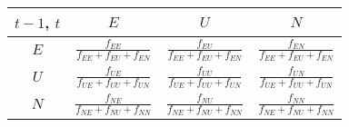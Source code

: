 \begin{tabular}{c|c|c|c}
  \hline \hline
  $t-1$, $t$ & $E$ & $U$ & $N$ \\ \hline
  $E$        & $\frac{f_{EE}}{f_{EE}+f_{EU}+f_{EN}}$
             & $\frac{f_{EU}}{f_{EE}+f_{EU}+f_{EN}}$
             & $\frac{f_{EN}}{f_{EE}+f_{EU}+f_{EN}}$
             \\ \hline
  $U$        & $\frac{f_{UE}}{f_{UE}+f_{UU}+f_{UN}}$
             & $\frac{f_{UU}}{f_{UE}+f_{UU}+f_{UN}}$
             & $\frac{f_{UN}}{f_{UE}+f_{UU}+f_{UN}}$
             \\ \hline
  $N$        & $\frac{f_{NE}}{f_{NE}+f_{NU}+f_{NN}}$
             & $\frac{f_{NU}}{f_{NE}+f_{NU}+f_{NN}}$
             & $\frac{f_{NN}}{f_{NE}+f_{NU}+f_{NN}}$
             \\ \hline \hline
\end{tabular}
